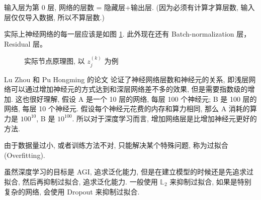 \begin{remark}
    输入层为第 0 层, 网络的层数 = 隐藏层+输出层. (因为必须有计算才算层数, 输入层仅仅导入数据, 所以不算层数.)
\end{remark}
\begin{remark}
    实际上神经网络的每一层应该是如图 \ref{nn-node-diagram}. 此外现在还有 Batch-normalization 层， Residual 层。
    \begin{figure}
        \centering
        \caption{实际节点原理图, 以 $ z_{j}^{(k)} $ 为例}
        \label{nn-node-diagram}
    \end{figure}
\end{remark}
\begin{remark}
    Lu Zhou 和 Pu Hongming 的论文 \cite{lu2017expressivepowerneuralnetworks} 论证了神经网络层数和神经元的关系, 即浅层网络可以通过增加神经元的方式达到和深层网络差不多的效果, 但是需要指数级的增加. 这也很好理解, 假设 A 是一个 10 层的网络, 每层 100 个神经元; B 是 100 层的网络, 每层 10 个神经元. 假设每个神经元花费的内存和算力相同, 那么 A 消耗的算力是 $100^{10}$, B 是 $10^{100}$. 所以对于深度学习而言, 增加网络层是比增加神经元更好的方法. 
\end{remark}

\begin{definition}
    由于数据量过小, 或者训练方法不对, 只能解决某个特殊问题, 称为过拟合(Overfitting). 
\end{definition}
\begin{remark}
    虽然深度学习的目标是 AGI, 追求泛化能力, 但是在建立模型的时候还是先追求过拟合, 然后再抑制过拟合, 追求泛化能力. 一般使用 $ \mathbb{L}_{2} $ 来抑制过拟合, 如果是特别复杂的网络, 会使用 Dropout 来抑制过拟合.  
\end{remark}

